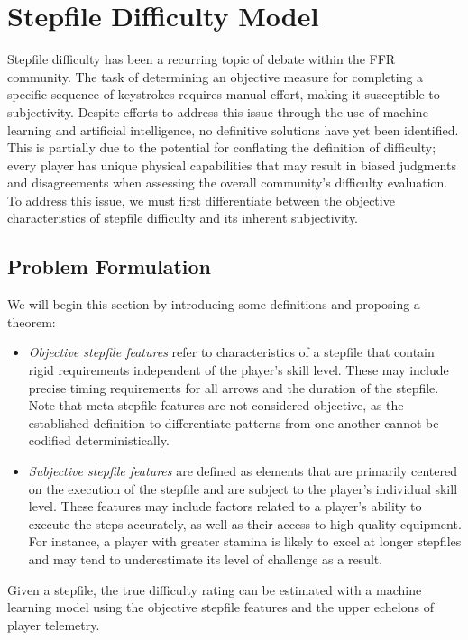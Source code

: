 \section{Stepfile Difficulty Model}
\label{sec:stepfile_difficulty}

Stepfile difficulty has been a recurring topic of debate within the FFR community. The task of determining an objective measure for completing a specific sequence of keystrokes requires manual effort, making it susceptible to subjectivity. Despite efforts to address this issue through the use of machine learning and artificial intelligence, no definitive solutions have yet been identified. This is partially due to the potential for conflating the definition of difficulty; every player has unique physical capabilities that may result in biased judgments and disagreements when assessing the overall community's difficulty evaluation. To address this issue, we must first differentiate between the objective characteristics of stepfile difficulty and its inherent subjectivity.

\subsection{Problem Formulation}

We will begin this section by introducing some definitions and proposing a theorem:

\begin{itemize}
    \item \textit{Objective stepfile features} refer to characteristics of a stepfile that contain rigid requirements independent of the player's skill level. These may include precise timing requirements for all arrows and the duration of the stepfile. Note that meta stepfile features are not considered objective, as the established definition to differentiate patterns from one another cannot be codified deterministically. 
    \item \textit{Subjective stepfile features} are defined as elements that are primarily centered on the execution of the stepfile and are subject to the player's individual skill level. These features may include factors related to a player's ability to execute the steps accurately, as well as their access to high-quality equipment. For instance, a player with greater stamina is likely to excel at longer stepfiles and may tend to underestimate its level of challenge as a result. 
\end{itemize}

\begin{theorem}
Given a stepfile, the true difficulty rating can be estimated with a machine learning model using the objective stepfile features and the upper echelons of player telemetry.
\end{theorem}

